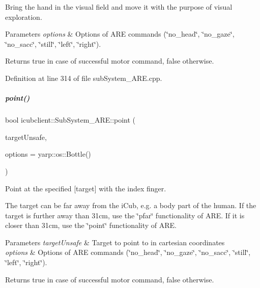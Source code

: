 Bring the hand in the visual field and move it with the purpose of visual exploration. 


\begin{DoxyParams}{Parameters}
{\em options} & Options of A\+RE commands (\char`\"{}no\+\_\+head\char`\"{}, \char`\"{}no\+\_\+gaze\char`\"{}, \char`\"{}no\+\_\+sacc\char`\"{}, \char`\"{}still\char`\"{}, \char`\"{}left\char`\"{}, \char`\"{}right\char`\"{}). \\
\hline
\end{DoxyParams}
\begin{DoxyReturn}{Returns}
true in case of successful motor command, false otherwise. 
\end{DoxyReturn}


Definition at line 314 of file sub\+System\+\_\+\+A\+R\+E.\+cpp.

\mbox{\label{group__icubclient__subsystems_a92fbb5f6c28b6bf9c7dec4ef3737b7c6}} 
\subparagraph{\texorpdfstring{point()}{point()}}
{\footnotesize\ttfamily bool icubclient\+::\+Sub\+System\+\_\+\+A\+R\+E\+::point (\begin{DoxyParamCaption}\item[{const yarp\+::sig\+::\+Vector\+Of$<$ double $>$ \&}]{target\+Unsafe,  }\item[{const yarp\+::os\+::\+Bottle \&}]{options = {\ttfamily yarp\+:\+:os\+:\+:Bottle()} }\end{DoxyParamCaption})}



Point at the specified \mbox{[}target\mbox{]} with the index finger. 

The target can be far away from the i\+Cub, e.\+g. a body part of the human. If the target is further away than 31cm, use the \char`\"{}pfar\char`\"{} functionality of A\+RE. If it is closer than 31cm, use the \char`\"{}point\char`\"{} functionality of A\+RE. 
\begin{DoxyParams}{Parameters}
{\em target\+Unsafe} & Target to point to in cartesian coordinates \\
\hline
{\em options} & Options of A\+RE commands (\char`\"{}no\+\_\+head\char`\"{}, \char`\"{}no\+\_\+gaze\char`\"{}, \char`\"{}no\+\_\+sacc\char`\"{}, \char`\"{}still\char`\"{}, \char`\"{}left\char`\"{}, \char`\"{}right\char`\"{}). \\
\hline
\end{DoxyParams}
\begin{DoxyReturn}{Returns}
true in case of successful motor command, false otherwise. 
\end{DoxyReturn}



